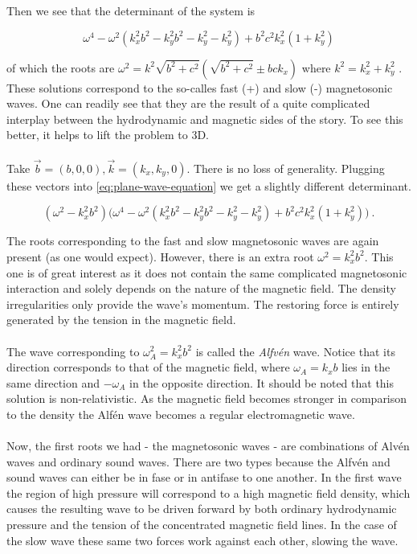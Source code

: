 Then we see that the determinant of the system is 

$$ \omega^4 - \omega^2(k_x^2 b^2 - k_y^2 b^2 - k_y^2 - k_y^2) + b^2 c^2 k_x^2(1 + k_y^2) $$

of which the roots are $ \omega^2 = k^2 \sqrt{b^2 + c^2}(\sqrt{b^2 + c^2} \pm bck_x) $ where $k^2 = k_x^2 + k_y^2$ . These solutions correspond to the so-calles fast (+) and slow (-) magnetosonic waves. One can readily see that they are the result of a quite complicated interplay between the hydrodynamic and magnetic sides of the story. To see this better, it helps to lift the problem to 3D.\\
\\
Take $ \vec{b} = (b,0,0), \vec{k} = (k_x, k_y,0) $. There is no loss of generality. Plugging these vectors into \autoref{eq:plane-wave-equation} we get a slightly different determinant.

$$ (\omega^2 - k_x^2 b^2)\big( \omega^4 - \omega^2(k_x^2 b^2 - k_y^2 b^2 - k_y^2 - k_y^2) + b^2 c^2 k_x^2(1 + k_y^2) \big) \ . $$
 
The roots corresponding to the fast and slow magnetosonic waves are again present (as one would expect). However, there is an extra root $\omega^2 = k_x^2 b^2$. This one is of great interest as it does not contain the same complicated magnetosonic interaction and solely depends on the nature of the magnetic field. The density irregularities only provide the wave's momentum. The restoring force is entirely generated by the tension in the magnetic field.\\
\\
The wave corresponding to $\omega_A^2 = k_x^2 b^2$ is called the \textit{Alfvén} wave. Notice that its direction corresponds to that of the magnetic field, where $\omega_A = k_x b$ lies in the same direction and $-\omega_A$ in the opposite direction. It should be noted that this solution is non-relativistic. As the magnetic field becomes stronger in comparison to the density the Alfén wave becomes a regular electromagnetic wave.\\
\\
Now, the first roots we had - the magnetosonic waves - are combinations of Alvén waves and ordinary sound waves. There are two types because the Alfvén and sound waves can either be in fase or in antifase to one another. In the first wave the region of high pressure will correspond to a high magnetic field density, which causes the resulting wave to be driven forward by both ordinary hydrodynamic pressure and the tension of the concentrated magnetic field lines. In the case of the slow wave these same two forces work against each other, slowing the wave.


